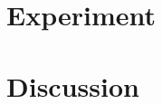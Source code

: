 \part{Experiment}
\label{part:experiment}


\part{Discussion}
\label{part:discussion}


\cleardoublepage %






\cleardoublepage %

\cleardoublepage %

\cleardoublepage %




